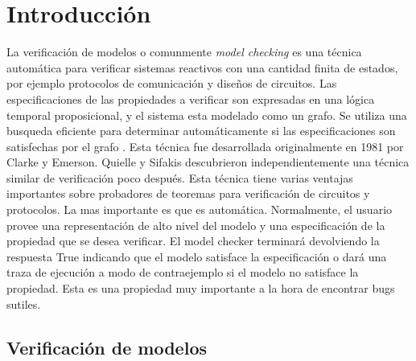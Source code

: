 \chapter{Introducción}

La verificación de modelos o comunmente \emph{model checking} es una técnica automática para verificar sistemas reactivos con una cantidad finita de estados, por ejemplo protocolos de comunicación y diseños de circuitos. Las especificaciones de las propiedades a verificar son expresadas en una lógica temporal proposicional, y el sistema esta modelado como un grafo. Se utiliza una busqueda eficiente para determinar automáticamente si las especificaciones son satisfechas por el grafo \cite{Clarke:5}. Esta técnica fue desarrollada originalmente en 1981 por Clarke y Emerson. Quielle y Sifakis descubrieron independientemente una técnica similar de verificación poco después.
Esta técnica tiene varias ventajas importantes sobre probadores de teoremas para verificación de circuitos y protocolos. La mas importante es que es automática. Normalmente, el usuario provee una representación de alto nivel del modelo y una especificación de la propiedad que se desea verificar. El model checker terminará devolviendo la respuesta True indicando que el modelo satisface la especificación o dará una traza de ejecución a modo de contraejemplo si el modelo no satisface la propiedad. Esta es una propiedad muy importante a la hora de encontrar bugs sutiles.

\section{Verificación de modelos}

